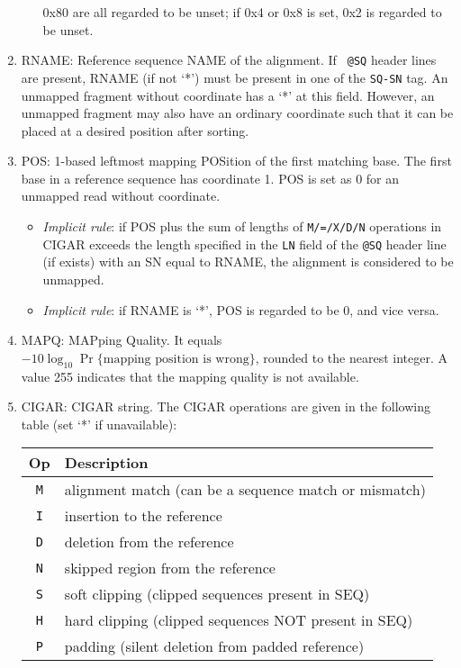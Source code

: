 \documentclass[10pt]{article}
\begin{document}
\begin{enumerate}
\begin{itemize}
    0x80 are all regarded to be unset; if 0x4 or 0x8 is set, 0x2 is
    regarded to be unset.
  \end{itemize}
\item {\sf RNAME}: Reference sequence NAME of the alignment. If {\tt
    @SQ} header lines are present, {\sf RNAME} (if not `*') must be
  present in one of the {\tt SQ-SN} tag. An unmapped fragment without
  coordinate has a `*' at this field. However, an unmapped fragment may
  also have an ordinary coordinate such that it can be placed at a
  desired position after sorting.
\item {\sf POS}: 1-based leftmost mapping POSition of the first matching
  base. The first base in a reference sequence has coordinate 1. {\sf
    POS} is set as 0 for an unmapped read without
  coordinate.
  \begin{itemize}
  \item \emph{Implicit rule}: if {\sf POS} plus the sum of lengths of
    {\tt M/=/X/D/N} operations in {\sf CIGAR} exceeds the length
    specified in the {\tt LN} field of the {\tt @SQ} header line (if
    exists) with an SN equal to {\sf RNAME}, the alignment is considered
    to be unmapped.
  \item \emph{Implicit rule}: if {\sf RNAME} is `*', {\sf POS} is
    regarded to be 0, and vice versa.
  \end{itemize}
\item {\sf MAPQ}: MAPping Quality. It equals
  $-10\log_{10}\Pr\{\mbox{mapping position is wrong}\}$, rounded to the
  nearest integer. A value 255 indicates that the mapping quality is not
  available.
\item {\sf CIGAR}: CIGAR string. The CIGAR operations are given in the
  following table (set `*' if unavailable):
  \begin{center}\small
  \begin{tabular}{cl}
  \hline
  Op & Description\\
  \hline
  {\tt M} & alignment match (can be a sequence match or mismatch)\\
  {\tt I} & insertion to the reference \\
  {\tt D} & deletion from the reference \\
  {\tt N} & skipped region from the reference \\
  {\tt S} & soft clipping (clipped sequences present in {\sf SEQ})\\
  {\tt H} & hard clipping (clipped sequences NOT present in {\sf SEQ})\\
  {\tt P} & padding (silent deletion from padded reference)\\

\end{tabular}
\end{center}
\end{enumerate}
\end{document}
